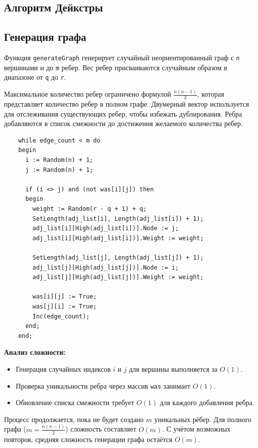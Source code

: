 \subsection{Алгоритм Дейкстры}

\subsection*{Генерация графа}

Функция \texttt{generateGraph} генерирует случайный неориентированный граф с \texttt{n} вершинами и до \texttt{m} ребер. Вес ребер присваиваются случайным образом в диапазоне от \texttt{q} до \texttt{r}.

Максимальное количество ребер ограничено формулой \( \frac{n(n-1)}{2} \), которая представляет количество ребер в полном графе. Двумерный вектор используется для отслеживания существующих ребер, чтобы избежать дублирования. Ребра добавляются в список смежности до достижения желаемого количества ребер.

\begin{lstlisting}
    while edge_count < m do
    begin
      i := Random(n) + 1;
      j := Random(n) + 1;

      if (i <> j) and (not was[i][j]) then
      begin
        weight := Random(r - q + 1) + q;
        SetLength(adj_list[i], Length(adj_list[i]) + 1);
        adj_list[i][High(adj_list[i])].Node := j;
        adj_list[i][High(adj_list[i])].Weight := weight;

        SetLength(adj_list[j], Length(adj_list[j]) + 1);
        adj_list[j][High(adj_list[j])].Node := i;
        adj_list[j][High(adj_list[j])].Weight := weight;

        was[i][j] := True;
        was[j][i] := True;
        Inc(edge_count);
      end;
    end;
\end{lstlisting}

\textbf{Анализ сложности:}
\begin{itemize}
    \item Генерация случайных индексов \(i\) и \(j\) для вершины выполняется за \(O(1)\).
    \item Проверка уникальности ребра через массив \texttt{was} занимает \(O(1)\).
    \item Обновление списка смежности требует \(O(1)\) для каждого добавления ребра.
\end{itemize}

Процесс продолжается, пока не будет создано \(m\) уникальных рёбер. Для полного графа (\(m = \frac{n(n-1)}{2}\)) сложность составляет \(O(m)\). С учётом возможных повторов, средняя сложность генерации графа остаётся \(O(m)\).

